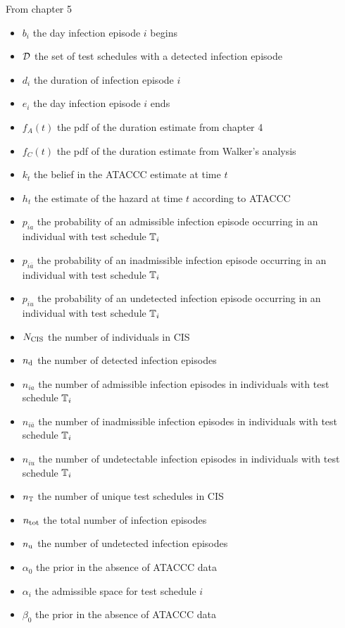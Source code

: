 \documentclass[thesis.tex]{subfiles}
\begin{document}
From chapter 5
\begin{itemize}
    \item $b_i$ the day infection episode $i$ begins
    \item $\mathcal{D}$ the set of test schedules with a detected infection episode
    \item $d_i$ the duration of infection episode $i$
    \item $e_i$ the day infection episode $i$ ends
    \item $f_A(t)$ the pdf of the duration estimate from chapter 4
    \item $f_C(t)$ the pdf of the duration estimate from Walker's analysis
    \item $k_t$ the belief in the ATACCC estimate at time $t$
    \item $h_t$ the estimate of the hazard at time $t$ according to ATACCC
    \item $p_{ia}$ the probability of an admissible infection episode occurring in an individual with test schedule $\mathbb{T}_i$
    \item $p_{i\bar{a}}$ the probability of an inadmissible infection episode occurring in an individual with test schedule $\mathbb{T}_i$
    \item $p_{iu}$ the probability of an undetected infection episode occurring in an individual with test schedule $\mathbb{T}_i$
    \item $N_\text{CIS}$ the number of individuals in CIS
    \item $n_\text{d}$ the number of detected infection episodes
    \item $n_{ia}$ the number of admissible infection episodes in individuals with test schedule $\mathbb{T}_i$
    \item $n_{i\bar{a}}$ the number of inadmissible infection episodes in individuals with test schedule $\mathbb{T}_i$
    \item $n_{iu}$ the number of undetectable infection episodes in individuals with test schedule $\mathbb{T}_i$
    \item $n_{\mathbb{T}}$ the number of unique test schedules in CIS
    \item $n_\text{tot}$ the total number of infection episodes
    \item $n_\text{u}$ the number of undetected infection episodes
    \item $\alpha_0$ the prior in the absence of ATACCC data
    \item $\alpha_i$ the admissible space for test schedule $i$
    \item $\beta_0$ the prior in the absence of ATACCC data

\end{itemize}
\end{document}
